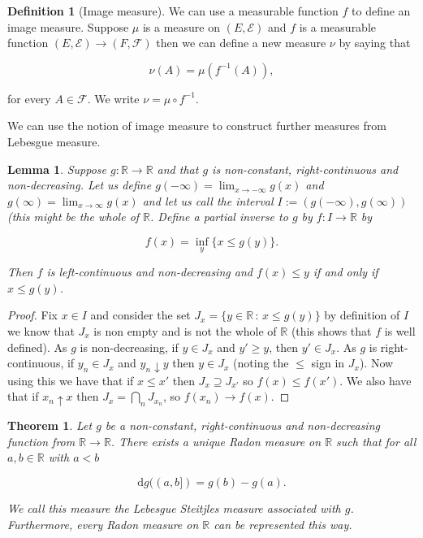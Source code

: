 \documentclass[
]{book}
\newtheorem{theorem}{Theorem}[chapter]
\newtheorem{lemma}{Lemma}[chapter]
\theoremstyle{definition}
\newtheorem{definition}{Definition}[chapter]
\theoremstyle{definition}
\theoremstyle{definition}
\theoremstyle{definition}
\theoremstyle{remark}
\begin{document}
\begin{definition}[Image measure]
We can use a measurable function \(f\) to define an image measure. Suppose \(\mu\) is a measure on \((E, \mathcal{E})\) and \(f\) is a measurable function \((E, \mathcal{E}) \rightarrow (F, \mathcal{F})\) then we can define a new measure \(\nu\) by saying that

\[ \nu(A) = \mu(f^{-1}(A)),  \]

for every \(A \in \mathcal{F}\). We write \(\nu = \mu \circ f^{-1}\).
\end{definition}

We can use the notion of image measure to construct further measures from Lebesgue measure.

\begin{lemma}
Suppose \(g: \mathbb{R} \rightarrow \mathbb{R}\) and that \(g\) is non-constant, right-continuous and non-decreasing. Let us define \(g(-\infty) = \lim_{x \rightarrow -\infty} g(x)\) and \(g(\infty) = \lim_{x \rightarrow \infty} g(x)\) and let us call the interval \(I:= (g(-\infty),g(\infty))\) (this might be the whole of \(\mathbb{R}\). Define a partial inverse to \(g\) by \(f: I \rightarrow \mathbb{R}\) by

\[ f(x) = \inf_y \{ x \leq g(y)\}. \]

Then \(f\) is left-continuous and non-decreasing and \(f(x) \leq y\) if and only if \(x \leq g(y)\).
\end{lemma}

\begin{proof}
Fix \(x \in I\) and consider the set \(J_x = \{ y \in \mathbb{R}\,:\, x \leq g(y)\}\) by definition of \(I\) we know that \(J_x\) is non empty and is not the whole of \(\mathbb{R}\) (this shows that \(f\) is well defined). As \(g\) is non-decreasing, if \(y \in J_x\) and \(y' \geq y\), then \(y' \in J_x\). As \(g\) is right-continuous, if \(y_n \in J_x\) and \(y_n \downarrow y\) then \(y \in J_x\) (noting the \(\leq\) sign in \(J_x\)). Now using this we have that if \(x \leq x'\) then \(J_x \supseteq J_{x'}\) so \(f(x) \leq f(x')\). We also have that if \(x_n \uparrow x\) then \(J_x = \bigcap_n J_{x_n}\), so \(f(x_n) \rightarrow f(x)\).
\end{proof}

\begin{theorem}
Let \(g\) be a non-constant, right-continuous and non-decreasing function from \(\mathbb{R} \rightarrow \mathbb{R}\). There exists a unique Radon measure on \(\mathbb{R}\) such that for all \(a,b \in \mathbb{R}\) with \(a < b\)

\[ \mathrm{d}g((a,b]) = g(b) - g(a). \]

We call this measure the \emph{Lebesgue Steitjles} measure associated with \(g\). Furthermore, every Radon measure on \(\mathbb{R}\) can be represented this way.
\end{theorem}
\end{document}
